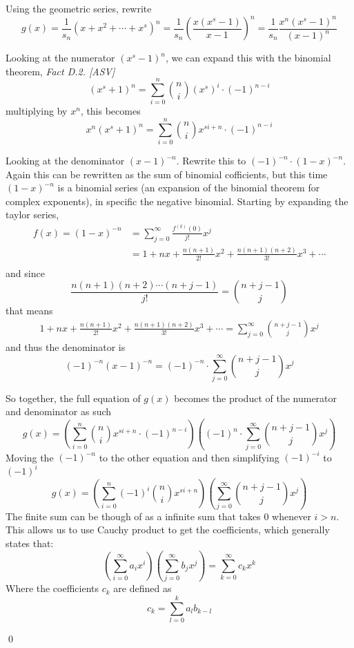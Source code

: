\documentclass[a4paper]{article}
\renewenvironment{proof}{{\bfseries Proof}}{\qed}
\begin{document}
\begin{proof}
    Using the geometric series, rewrite
    $$
    g(x) = \frac{1}{s_n}(x + x^2 + \cdots + x^s)^n = \frac{1}{s_n} \left(\frac{x(x^s-1)}{x-1} \right)^n = \frac{1}{s_n} \frac{x^n(x^s-1)^n}{(x-1)^n}
    $$

    Looking at the numerator $(x^s - 1)^n$, we can expand this with the binomial theorem, \textit{Fact D.2. [ASV]}
    $$
    (x^s+1)^n = \sum_{i = 0}^{n} \binom{n}{i} (x^s)^i \cdot (-1)^{n-i}
    $$
    multiplying by $x^n$, this becomes
    $$
    x^n(x^s+1)^n = \sum_{i = 0}^{n} \binom{n}{i} x^{si+n} \cdot (-1)^{n-i}
    $$ 

    Looking at the denominator $(x-1)^{-n}$. Rewrite this to $(-1)^{-n} \cdot (1-x)^{-n}$. Again this can be rewritten as the sum of binomial cofficients, but this time $(1-x)^{-n}$ is a binomial series (an expansion of the binomial theorem for complex exponents), in specific the negative binomial. Starting by expanding the taylor series,
    \begin{align*}
        f(x) = (1-x)^{-n} &= \sum_{j = 0}^{\infty} \frac{f^{(k)}(0)}{j!} x^j \\
        &=1 + nx + \frac{n(n+1)}{2!} x^2 + \frac{n(n+1)(n+2)}{3!} x^3 + \cdots \\
    \end{align*}  
    and since 
    $$
    \frac{n(n+1)(n+2) \cdots (n+j-1)}{j!} = \binom{n+j-1}{j}
    $$
    that means
    \begin{align*}
        1 + nx + \frac{n(n+1)}{2!} x^2 + \frac{n(n+1)(n+2)}{3!} x^3 + \cdots = \sum_{j = 0}^{\infty}\binom{n+j-1}{j} x^j
    \end{align*}
    and thus the denominator is 
    $$ 
    (-1)^{-n} (x-1)^{-n} = (-1)^{-n} \cdot\sum_{j = 0}^{\infty}\binom{n+j-1}{j} x^j 
    $$

    So together, the full equation of $g(x)$ becomes the product of the numerator and denominator as such  
    $$
    g(x) = \left(\sum_{i = 0}^{n} \binom{n}{i} x^{si+n} \cdot (-1)^{n-i} \right) \left((-1)^n \cdot \sum_{j = 0}^{\infty}\binom{n+j-1}{j} x^j \right)
    $$ 
    Moving the $(-1)^{-n}$ to the other equation and then simplifying $(-1)^{-i}$ to $(-1)^i$  
    $$
    g(x) = \left(\sum_{i = 0}^{n} (-1)^i \binom{n}{i} x^{si+n} \right) \left(\sum_{j = 0}^{\infty}\binom{n+j-1}{j} x^j \right)
    $$ 
    The finite sum can be though of as a infinite sum that takes 0 whenever $i > n$. This allows us to use Cauchy product to get the coefficients, which generally states that:
    $$
    \left(\sum_{i=0}^{\infty} a_i x^i \right) \left(\sum_{j=0}^{\infty} b_j x^j \right) = \sum_{k=0}^{\infty} c_k x^k
    $$  
    Where the coefficients $c_k$ are defined as
    $$
    c_k = \sum_{l = 0}^{k} a_l b_{k-l}
    $$


\end{proof}
\end{document}
